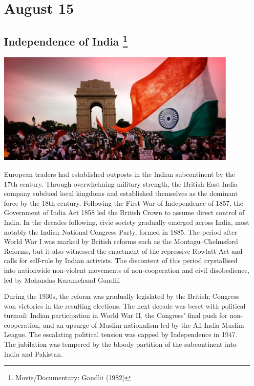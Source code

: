 \documentclass[11pt]{report}
\begin{document}
\section{August 15}
\subsection{Independence of India \protect\footnote{Movie/Documentary: Gandhi (1982)}}
\vspace{2mm}\begin{center}\includegraphics[width=12cm]{./img/independenceIndia.jpg}\end{center}
European traders had established outposts in the Indian subcontinent by the 17th century. Through overwhelming military strength, the British East India company subdued local kingdoms and established themselves as the dominant force by the 18th century. Following the First War of Independence of 1857, the Government of India Act 1858 led the British Crown to assume direct control of India. In the decades following, civic society gradually emerged across India, most notably the Indian National Congress Party, formed in 1885. The period after World War I was marked by British reforms such as the Montagu–Chelmsford Reforms, but it also witnessed the enactment of the repressive Rowlatt Act and calls for self-rule by Indian activists. The discontent of this period crystallised into nationwide non-violent movements of non-cooperation and civil disobedience, led by Mohandas Karamchand Gandhi

During the 1930s, the reform was gradually legislated by the British; Congress won victories in the resulting elections. The next decade was beset with political turmoil: Indian participation in World War II, the Congress' final push for non-cooperation, and an upsurge of Muslim nationalism led by the All-India Muslim League. The escalating political tension was capped by Independence in 1947. The jubilation was tempered by the bloody partition of the subcontinent into India and Pakistan.
\end{document}
